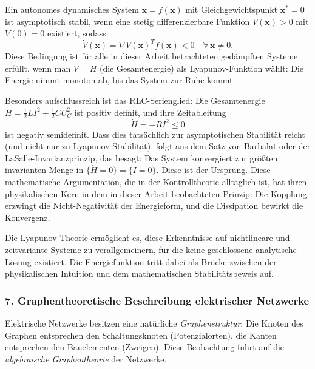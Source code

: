 ﻿\documentclass[12pt, a4paper]{article}
\begin{document}
	Ein autonomes dynamisches System $\dot{\mathbf{x}} = f(\mathbf{x})$ mit Gleichgewichtspunkt $\mathbf{x}^* = 0$ ist asymptotisch stabil, wenn eine stetig differenzierbare Funktion $V(\mathbf{x}) > 0$ mit $V(0) = 0$ existiert, sodass
	\begin{equation}
		\dot{V}(\mathbf{x}) = \nabla V(\mathbf{x})^T f(\mathbf{x}) < 0 \quad \forall\, \mathbf{x} \neq 0.
	\end{equation}
	Diese Bedingung ist für alle in dieser Arbeit betrachteten gedämpften Systeme erfüllt, wenn man $V = H$ (die Gesamtenergie) als Lyapunov-Funktion wählt: Die Energie nimmt monoton ab, bis das System zur Ruhe kommt.

	Besonders aufschlussreich ist das RLC-Serienglied: Die Gesamtenergie $H = \frac{1}{2}LI^2 + \frac{1}{2}CU_C^2$ ist positiv definit, und ihre Zeitableitung
	\begin{equation}
		\dot{H} = -R I^2 \leq 0
	\end{equation}
	ist negativ semidefinit. Dass dies tatsächlich zur asymptotischen Stabilität reicht (und nicht nur zu Lya\-punov-Stabilität), folgt aus dem Satz von Barbalat oder der LaSalle-Invarianzprinzip, das besagt: Das System konvergiert zur größten invarianten Menge in $\{\dot{H} = 0\} = \{I = 0\}$. Diese ist der Ursprung. Diese mathematische Argumentation, die in der Kontrolltheorie alltäglich ist, hat ihren physikalischen Kern in dem in dieser Arbeit beobachteten Prinzip: Die Kopplung erzwingt die Nicht-Negativität der Energieform, und die Dissipation bewirkt die Konvergenz.

	Die Lyapunov-Theorie ermöglicht es, diese Erkenntnisse auf nichtlineare und zeitvariante Systeme zu verallgemeinern, für die keine geschlossene analytische Lösung existiert. Die Energiefunktion tritt dabei als Brücke zwischen der physikalischen Intuition und dem mathematischen Stabilitätsbeweis auf.

	\subsubsection*{7. \quad Graphentheoretische Beschreibung elektrischer Netzwerke}

	Elektrische Netzwerke besitzen eine natürliche \textit{Graphenstruktur}: Die Knoten des Graphen entsprechen den Schaltungsknoten (Potenzialorten), die Kanten entsprechen den Bauelementen (Zweigen). Diese Beobachtung führt auf die \textit{algebraische Graphentheorie} der Netzwerke.
\end{document}
